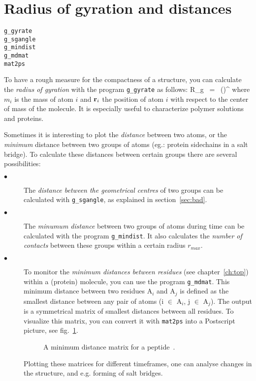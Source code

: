 \section{Radius of gyration and distances}
\label{sec:rg}
\begin{verbatim}
g_gyrate
g_sgangle
g_mindist
g_mdmat
mat2ps
\end{verbatim}
To have a rough measure for the compactness of a structure, you can calculate 
the {\em radius of gyration} with the program {\tt g\_gyrate} as follows:
\beq
R_g ~=~ \left({}\right)^{\half}
\label{eq:rg}
\eeq
where $m_i$ is the mass of atom $i$ and ${\bf r}_i$ the position of 
atom $i$ with respect to the center of mass of the molecule. It is especially 
useful to characterize polymer solutions and proteins.

Sometimes it is interesting to plot the {\em distance} between two atoms,
or the {\em minimum} distance between two groups of atoms
(eg.: protein sidechains in a salt bridge). 
To calculate these distances between certain groups there are several 
possibilities:
\begin{description}
\item[$\bullet$] 
The {\em distance between the geometrical centres} of two groups can be 
calculated with {\tt g\_sgangle}, as explained in section~\ref{sec:bad}. 
\item[$\bullet$] 
The {\em minumum distance} between two groups of atoms during time 
can be calculated with the program {\tt g\_mindist}. It also calculates the 
{\em number of contacts} between these groups 
within a certain radius $r_{max}$.
\item[$\bullet$] 
To monitor the {\em minimum distances between residues} 
(see chapter~\ref{ch:top}) within a (protein) molecule, you can use 
the program {\tt g\_mdmat}. This minimum distance between two residues
A$_i$ and A$_j$ is defined as the smallest distance between any pair of 
atoms (i $\in$ A$_i$, j $\in$ A$_j$).
The output is a symmetrical matrix of smallest distances 
between all residues. To visualize this matrix, you can convert it with 
{\tt mat2ps} into a Postscript picture, see fig.~\ref{fig:mdmat}.
%
\begin{figure}[hbtp]
\centerline{
}
\caption{A minimum distance matrix for a peptide~\protect\cite{Spoel96b}.}
\label{fig:mdmat}
\end{figure}
%
Plotting these matrices for different timeframes, one can analyse changes 
in the structure, and e.g. forming of salt bridges.
\end{description}
%
%
